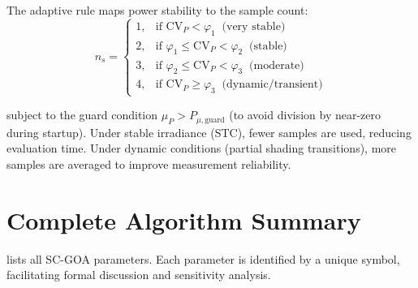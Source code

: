 \documentclass[a4paper, 12pt]{article}
\begin{document}
The adaptive rule maps power stability to the sample count:
\begin{equation}
    n_s =
    \begin{cases}
        1, & \text{if } \mathrm{CV}_P < \varphi_1 \;\;\text{(very stable)} \\
        2, & \text{if } \varphi_1 \leq \mathrm{CV}_P < \varphi_2 \;\;\text{(stable)} \\
        3, & \text{if } \varphi_2 \leq \mathrm{CV}_P < \varphi_3 \;\;\text{(moderate)} \\
        4, & \text{if } \mathrm{CV}_P \geq \varphi_3 \;\;\text{(dynamic/transient)}
    \end{cases}
    \label{eq:adaptive_samples}
\end{equation}

subject to the guard condition $\mu_P > P_{\mu,\mathrm{guard}}$ (to avoid division by near-zero during startup). Under stable irradiance (STC), fewer samples are used, reducing evaluation time. Under dynamic conditions (partial shading transitions), more samples are averaged to improve measurement reliability.


\section{Complete Algorithm Summary}
\label{sec:summary}

 lists all SC-GOA parameters. Each parameter is identified by a unique symbol, facilitating formal discussion and sensitivity analysis.
\end{document}
